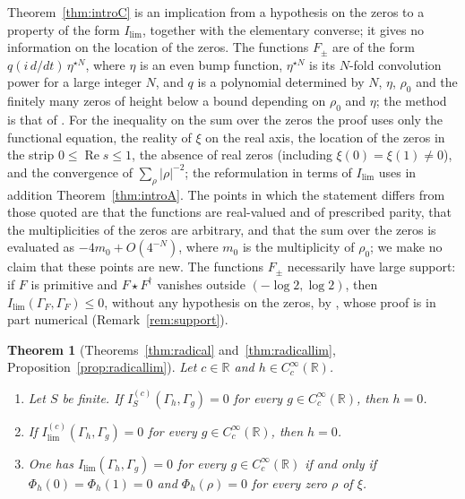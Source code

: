 \documentclass[11pt]{amsart}
\newtheorem{theorem}{Theorem}[section]
\theoremstyle{remark}
\numberwithin{equation}{section}
\newcommand{\R}{\mathbb R}
\newcommand{\Rel}{\operatorname{Re}}
\newcommand{\Il}{I_{\lim}}
\begin{document}
Theorem~\ref{thm:introC} is an implication from a hypothesis on the zeros to
a property of the form $\Il$, together with the elementary converse; it gives
no information on the location of the zeros.  The functions $F_\pm$ are of
the form $q(i\,d/dt)\,\eta^{\star N}$, where $\eta$ is an even bump function,
$\eta^{\star N}$ is its $N$-fold convolution power for a large integer $N$,
and $q$ is a polynomial determined by $N$, $\eta$, $\rho_0$ and the finitely
many zeros of height below a bound depending on $\rho_0$ and $\eta$; the
method is that of \cite{Yoshida,CCWeilArch}.  For the inequality on the sum
over the zeros the proof uses only the functional equation, the reality of
$\xi$ on the real axis, the location of the zeros in the strip
$0\le\Rel s\le1$, the absence of real zeros (including
$\xi(0)=\xi(1)\ne0$), and the convergence of
$\sum_\rho|\rho|^{-2}$; the reformulation in terms of $\Il$ uses in addition
Theorem~\ref{thm:introA}.  The points in which the statement differs from
those quoted are that the functions are real-valued and of prescribed
parity, that the multiplicities of the zeros are arbitrary, and that the
sum over the zeros is evaluated as $-4m_0+O(4^{-N})$, where $m_0$ is the
multiplicity of $\rho_0$; we make no claim that these points are new.  The
functions $F_\pm$ necessarily have large support: if $F$ is primitive and
$F\star F^\dagger$ vanishes outside $(-\log2,\log2)$, then
$\Il(\Gamma_F,\Gamma_F)\le0$, without any hypothesis on the zeros, by
\cite[Theorem~1]{Yoshida}, whose proof is in part numerical
(Remark~\ref{rem:support}).

\begin{theorem}[Theorems~\ref{thm:radical} and~\ref{thm:radicallim},
Proposition~\ref{prop:radicallim}]
\label{thm:introD}
Let $c\in\R$ and $h\in C_c^\infty(\R)$.
\begin{enumerate}
\item[(i)] Let $S$ be finite.  If $I^{(c)}_S(\Gamma_h,\Gamma_g)=0$ for every
$g\in C_c^\infty(\R)$, then $h=0$.
\item[(ii)] If $I^{(c)}_{\lim}(\Gamma_h,\Gamma_g)=0$ for every
$g\in C_c^\infty(\R)$, then $h=0$.
\item[(iii)] One has $\Il(\Gamma_h,\Gamma_g)=0$ for every
$g\in C_c^\infty(\R)$ if and only if $\Phi_h(0)=\Phi_h(1)=0$ and
$\Phi_h(\rho)=0$ for every zero $\rho$ of $\xi$.
\end{enumerate}
\end{theorem}
\end{document}
